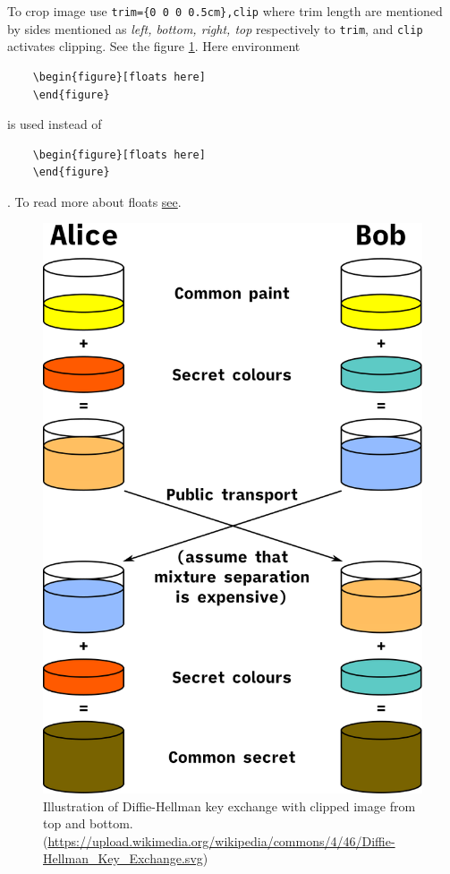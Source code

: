 To crop image use \verb|trim={0 0 0 0.5cm},clip| where trim length are mentioned by sides mentioned as \textit{left, bottom, right, top} respectively to \verb|trim|, and \verb|clip| activates clipping. See the figure \ref{fig:diffie-hellman-illus-2}. Here environment \begin{verbatim}
    \begin{figure}[floats here]
    \end{figure}
\end{verbatim}
is used instead of
\begin{verbatim}
    \begin{figure}[floats here]
    \end{figure}
\end{verbatim}. To read more about floats \href{https://www.overleaf.com/learn/latex/Errors/\%60!h\%27_float_specifier_changed_to_\%60!ht\%27}{see}. 

\begin{figure}[!h]
    \centering
    \includegraphics[width=\linewidth,trim={0 0.5 0 0.5cm},clip,scale=0.50]{sections/acm-template-sections/images/Diffie-Hellman_Key_Exchange.svg.png}
    \caption{Illustration of Diffie-Hellman key exchange with clipped image from top and bottom. (\url{https://upload.wikimedia.org/wikipedia/commons/4/46/Diffie-Hellman_Key_Exchange.svg})}
    \label{fig:diffie-hellman-illus-2}
\end{figure}


